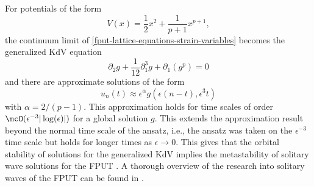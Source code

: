 \documentclass[oneside,reqno]{amsart}
\begin{document}
For potentials of the form
\begin{equation}\label{generic-potential}
	V(x) = \frac 1 2 x^2 + \frac 1 {p+1} x^{p+1},
\end{equation}
the continuum limit of \cref{fput-lattice-equations-strain-variables} becomes the generalized KdV equation
\begin{equation}
	\partial_2 g + \frac 1 {12} \partial_1^3 g + \partial_1( g^p) = 0
\end{equation}
and there are approximate solutions of the form
\begin{equation}
	u_n(t) \approx \epsilon^{\alpha} g(\epsilon(n-t), \epsilon^3 t)
\end{equation}
with \(\alpha = 2/(p-1)\). This approximation holds for time scales of order \(\mcO( \epsilon^{-3} |\log(\epsilon)|)\) for a global solution \(g\). This extends the approximation result beyond the normal time scale of the ansatz, i.e., the ansatz was taken on the \(\epsilon^{-3}\) time scale but holds for longer times as \(\epsilon \to 0\). This gives that the orbital stability of solutions for the generalized KdV implies the metastability of solitary wave solutions for the FPUT \cite{khan2017long}. A thorough overview of the research  into solitary waves of the FPUT can be found in \cite{vainchtein2022solitary}.
\end{document}
